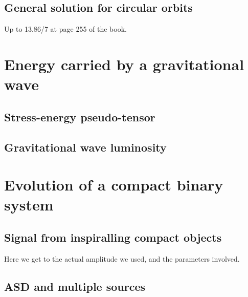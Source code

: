 \subsection{General solution for circular orbits}
Up to 13.86/7 at page 255 of the book.

\section{Energy carried by a gravitational wave}
\subsection{Stress-energy pseudo-tensor}
\subsection{Gravitational wave luminosity}

\section{Evolution of a compact binary system}
\subsection{Signal from inspiralling compact objects}
Here we get to the actual amplitude we used, and the parameters involved.
\subsection{ASD and multiple sources}
